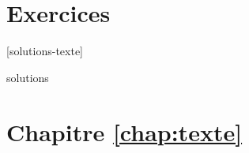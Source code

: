 

\section{Exercices}
\label{sec:texte:exercices}

[solutions-texte]

\begin{Filesave}{solutions}
\section*{Chapitre \ref*{chap:texte}}

\end{Filesave}


